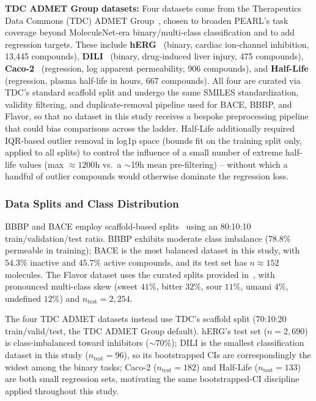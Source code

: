 \documentclass[pdflatex,sn-mathphys-num]{sn-jnl}%
\begin{document}
\textbf{TDC ADMET Group datasets:} Four datasets come from the Therapeutics Data Commons (TDC) ADMET Group~\cite{huang2021tdc}, chosen to broaden PEARL's task coverage beyond MoleculeNet-era binary/multi-class classification and to add regression targets. These include \textbf{hERG}~\cite{wang2016herg} (binary, cardiac ion-channel inhibition, 13{,}445 compounds), \textbf{DILI}~\cite{xu2019dili} (binary, drug-induced liver injury, 475 compounds), \textbf{Caco-2}~\cite{wang2016caco2} (regression, log apparent permeability, 906 compounds), and \textbf{Half-Life}~\cite{obach2008half} (regression, plasma half-life in hours, 667 compounds). All four are curated via TDC's standard scaffold split and undergo the same SMILES standardization, validity filtering, and duplicate-removal pipeline used for BACE, BBBP, and Flavor, so that no dataset in this study receives a bespoke preprocessing pipeline that could bias comparisons across the ladder. Half-Life additionally required IQR-based outlier removal in log1p space (bounds fit on the training split only, applied to all splits) to control the influence of a small number of extreme half-life values (max $\approx 1200$h vs.\ a $\sim$19h mean pre-filtering) -- without which a handful of outlier compounds would otherwise dominate the regression loss.

\subsubsection{Data Splits and Class Distribution}\label{sec:data_splits}
BBBP and BACE employ scaffold-based splits~\cite{ramsundar2019deep} using an 80:10:10 train/validation/test ratio. BBBP exhibits moderate class imbalance (78.8\% permeable in training); BACE is the most balanced dataset in this study, with $54.3\%$ inactive and $45.7\%$ active compounds, and its test set has $n\approx152$ molecules. The Flavor dataset uses the curated splits provided in~\cite{zimmermann2024fart}, with pronounced multi-class skew (sweet $41\%$, bitter $32\%$, sour $11\%$, umami $4\%$, undefined $12\%$) and $n_\text{test}=2{,}254$.

The four TDC ADMET datasets instead use TDC's scaffold split (70:10:20 train/valid/test, the TDC ADMET Group default). hERG's test set ($n=2{,}690$) is class-imbalanced toward inhibitors ($\sim$70\%); DILI is the smallest classification dataset in this study ($n_\text{test}=96$), so its bootstrapped CIs are correspondingly the widest among the binary tasks; Caco-2 ($n_\text{test}=182$) and Half-Life ($n_\text{test}=133$) are both small regression sets, motivating the same bootstrapped-CI discipline applied throughout this study.
\end{document}

